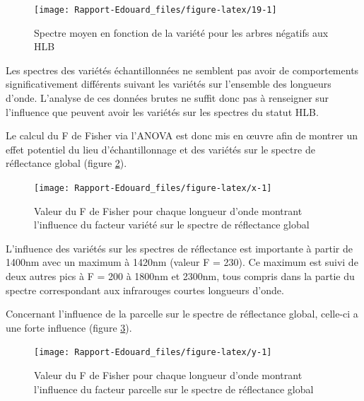 \documentclass[
  11pt,
  french,
  a4paper,
  extrafontsizes,onecolumn,openright
  ]{memoir}
\begin{document}
\scriptsize

\begin{figure}

{\centering \texttt{[image: Rapport-Edouard\_files/figure-latex/19-1]} 

}

\caption{Spectre moyen en fonction de la variété pour les arbres négatifs aux HLB}\label{fig:19}
\end{figure}

\normalsize

Les spectres des variétés échantillonnées ne semblent pas avoir de comportements significativement différents suivant les variétés sur l'ensemble des longueurs d'onde. L'analyse de ces données brutes ne suffit donc pas à renseigner sur l'influence que peuvent avoir les variétés sur les spectres du statut HLB.

Le calcul du F de Fisher via l'ANOVA est donc mis en œuvre afin de montrer un effet potentiel du lieu d'échantillonnage et des variétés sur le spectre de réflectance global (figure \ref{fig:x}).

\scriptsize

\begin{figure}

{\centering \texttt{[image: Rapport-Edouard\_files/figure-latex/x-1]} 

}

\caption{Valeur du F de Fisher pour chaque longueur d’onde montrant l’influence du facteur variété sur le spectre de réflectance global}\label{fig:x}
\end{figure}

\normalsize

\vfill
\newpage

L'influence des variétés sur les spectres de réflectance est importante à partir de 1400nm avec un maximum à 1420nm (valeur F = 230). Ce maximum est suivi de deux autres pics à F = 200 à 1800nm et 2300nm, tous compris dans la partie du spectre correspondant aux infrarouges courtes longueurs d'onde.

Concernant l'influence de la parcelle sur le spectre de réflectance global, celle-ci a une forte influence (figure \ref{fig:y}).

\scriptsize

\begin{figure}

{\centering \texttt{[image: Rapport-Edouard\_files/figure-latex/y-1]} 

}

\caption{Valeur du F de Fisher pour chaque longueur d’onde montrant l’influence du facteur parcelle sur le spectre de réflectance global}\label{fig:y}
\end{figure}
\end{document}
